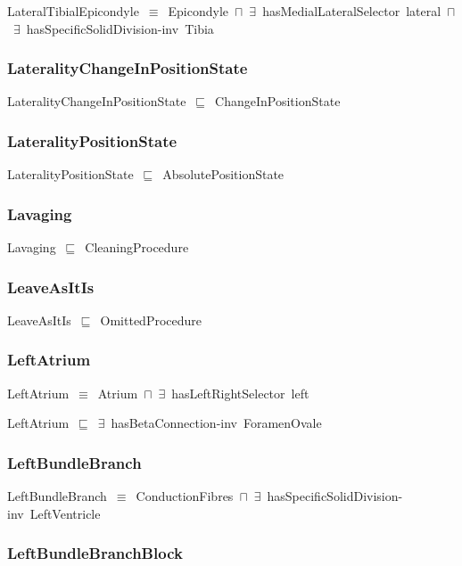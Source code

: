 \documentclass{article}
\begin{document}
LateralTibialEpicondyle~\ensuremath{\equiv}~Epicondyle~\ensuremath{\sqcap}~\ensuremath{\exists}~hasMedialLateralSelector~lateral~\ensuremath{\sqcap}~\ensuremath{\exists}~hasSpecificSolidDivision-inv~Tibia

\subsubsection*{LateralityChangeInPositionState}

LateralityChangeInPositionState~\ensuremath{\sqsubseteq}~ChangeInPositionState~

\subsubsection*{LateralityPositionState}

LateralityPositionState~\ensuremath{\sqsubseteq}~AbsolutePositionState~

\subsubsection*{Lavaging}

Lavaging~\ensuremath{\sqsubseteq}~CleaningProcedure~

\subsubsection*{LeaveAsItIs}

LeaveAsItIs~\ensuremath{\sqsubseteq}~OmittedProcedure~

\subsubsection*{LeftAtrium}

LeftAtrium~\ensuremath{\equiv}~Atrium~\ensuremath{\sqcap}~\ensuremath{\exists}~hasLeftRightSelector~left

LeftAtrium~\ensuremath{\sqsubseteq}~\ensuremath{\exists}~hasBetaConnection-inv~ForamenOvale~

\subsubsection*{LeftBundleBranch}

LeftBundleBranch~\ensuremath{\equiv}~ConductionFibres~\ensuremath{\sqcap}~\ensuremath{\exists}~hasSpecificSolidDivision-inv~LeftVentricle

\subsubsection*{LeftBundleBranchBlock}
\end{document}
